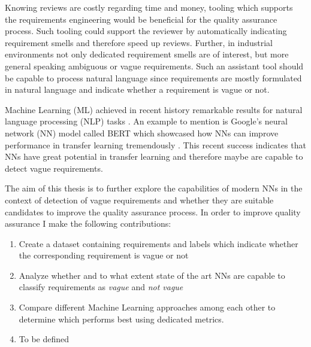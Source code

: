 Knowing reviews are costly regarding time and money, tooling which supports the requirements engineering would be beneficial for the quality assurance process.
Such tooling could support the reviewer by automatically indicating requirement smells and therefore speed up reviews.
Further, in industrial environments not only dedicated requirement smells are of interest, but more general speaking ambiguous or vague requirements.
Such an assistant tool should be capable to process natural language since requirements are mostly formulated in natural language \parencite{Mich:2004} and indicate whether a requirement is vague or not.

Machine Learning (ML) achieved in recent history remarkable results for natural language processing (NLP) tasks \parencite{Khan:2016}.
An example to mention is Google's neural network (NN) model called BERT which showcased how NNs can improve performance in transfer learning tremendously \parencite{Devlin:2018}.
This recent success indicates that NNs have great potential in transfer learning and therefore maybe are capable to detect vague requirements.

The aim of this thesis is to further explore the capabilities of modern NNs in the context of detection of vague requirements and whether they are suitable candidates to improve the quality assurance process.
In order to improve quality assurance I make the following contributions:
\begin{enumerate}
    \item Create a dataset containing requirements and labels which indicate whether the corresponding requirement is vague or not
    \item Analyze whether and to what extent state of the art NNs are capable to classify requirements as \textit{vague} and \textit{not vague}
    \item Compare different Machine Learning approaches among each other to determine which performs best using dedicated metrics.
    \item To be defined
\end{enumerate}
